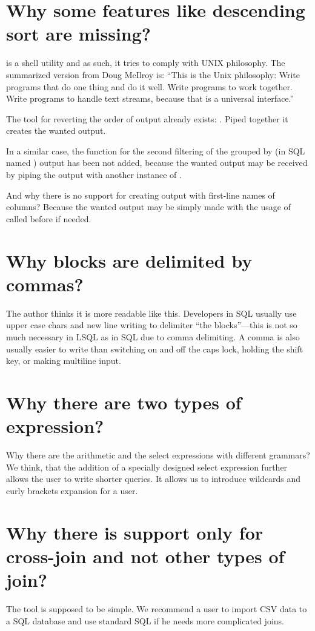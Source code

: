 \section{Why some features like descending sort are missing?}
 is a shell utility and as such, it tries to comply with UNIX philosophy. 
The summarized version from Doug McIlroy is: ``This is the Unix philosophy: Write programs that do one thing and do it well. Write programs to work together. 
Write programs to handle text streams, because that is a universal interface.'' \cite{unix-philosophy}

The tool for reverting the order of output already exists: . Piped together it creates the wanted output.

In a similar case, the function for the second filtering of the grouped by (in SQL named ) 
output has been not added, because the wanted output
may be received by piping the output with another instance of .

And why there is no support for creating output with first-line names of columns? Because the wanted output
may be simply made with the usage of  called before  if needed.

\section{Why blocks are delimited by commas?}
The author thinks it is more readable like this. Developers in SQL usually use upper case chars and new line writing to delimiter ``the blocks''---this is not so much necessary in LSQL as in SQL due to comma delimiting. 
A comma is also usually easier to write than switching on and off the caps lock, 
holding the shift key, or making multiline input.

\section{Why there are two types of expression?}
Why there are the arithmetic and the select expressions with different grammars?
We think, that the addition of a specially designed select expression further allows the user to write shorter queries.
It allows us to introduce wildcards and curly brackets expansion for a user.

\section{Why there is support only for cross-join and not other types of join?}
The tool is supposed to be simple. We recommend a user to import CSV data to a SQL database and use standard SQL if he needs more complicated joins.

